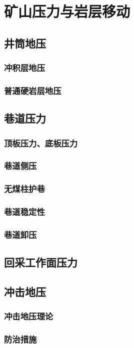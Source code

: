 \documentclass[UTF8]{../../ApplicationUniverse}
\begin{document}
\section{矿山压力与岩层移动}
    \subsection{井筒地压}
        \subsubsection{冲积层地压}
        \subsubsection{普通硬岩层地压}
    \subsection{巷道压力}
        \subsubsection{顶板压力、底板压力}
        \subsubsection{巷道侧压}
        \subsubsection{无煤柱护巷}
        \subsubsection{巷道稳定性}
        \subsubsection{巷道卸压}
    \subsection{回采工作面压力}
    \subsection{冲击地压}
        \subsubsection{冲击地压理论}
        \subsubsection{防治措施}
\end{document}
